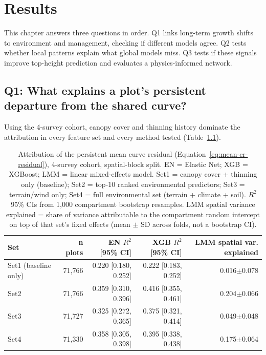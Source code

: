 \documentclass[logo,msc,ai]{infthesis}           %
\begin{document}
\chapter{Results} \label{ch:results}
This chapter answers three questions in order. Q1 links long-term growth shifts to environment and management, checking if different models agree. Q2 tests whether local patterns explain what global models miss. Q3 tests if these signals improve top-height prediction and evaluates a physics-informed network.

\section{Q1: What explains a plot's persistent departure from the shared curve?}
Using the 4-survey cohort, canopy cover and thinning history dominate the attribution in every feature set and every method tested (Table~\ref{tab:results-q1}).
\begin{table}[!htbp]
\centering
\scriptsize
\renewcommand{\arraystretch}{1.2}
\begin{tabular*}{\textwidth}{@{\extracolsep{\fill}}lrrrr@{}}
\toprule
Set & n plots & EN $R^2$ [95\% CI] & XGB $R^2$ [95\% CI] & LMM spatial var. explained \\
\midrule
Set1 (baseline only) & 71{,}766 & 0.220 [0.180, 0.252] & 0.222 [0.183, 0.252] & 0.016$\pm$0.078 \\
Set2 & 71{,}766 & 0.359 [0.310, 0.396] & 0.416 [0.355, 0.461] & 0.204$\pm$0.066 \\
Set3 & 71{,}727 & 0.325 [0.272, 0.365] & 0.375 [0.321, 0.414] & 0.049$\pm$0.048 \\
Set4 & 71{,}330 & 0.358 [0.305, 0.398] & 0.395 [0.338, 0.438] & 0.175$\pm$0.064 \\
\bottomrule
\end{tabular*}
\caption{\footnotesize{Attribution of the persistent mean curve residual (Equation~\ref{eq:mean-cr-residual}),
4-survey cohort, spatial-block split. EN = Elastic Net; XGB = XGBoost; LMM = linear mixed-effects model.
Set1 = canopy cover + thinning only (baseline); Set2 = top-10 ranked environmental predictors; Set3 =
terrain/wind only; Set4 = full environmental set (terrain + climate + soil). $R^2$ 95\% CIs from 1,000
compartment bootstrap resamples. LMM spatial variance explained = share of variance attributable to the
compartment random intercept on top of that set's fixed effects (mean $\pm$ SD across folds, not a
bootstrap CI).}}
\label{tab:results-q1}
\end{table}
\end{document}
